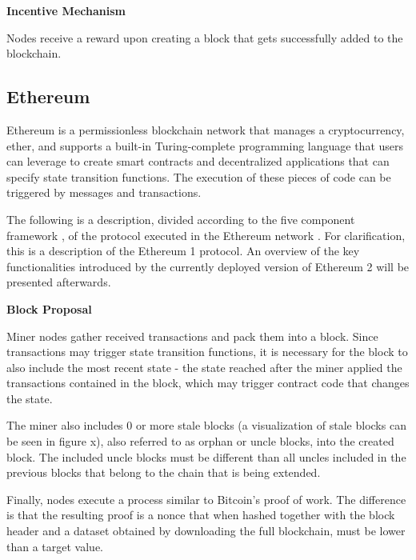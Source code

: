 \vspace{0.25cm}

\textbf{Incentive Mechanism}

Nodes receive a reward upon creating a block that gets successfully added to the blockchain.





\subsection{Ethereum}

Ethereum \cite{ethereum_whitepaper} \cite{ethereum_yellowpaper} is a permissionless blockchain network that manages a cryptocurrency, ether, and supports a built-in Turing-complete programming language that users can leverage to create smart contracts and decentralized applications that can specify state transition functions. The execution of these pieces of code can be triggered by messages and transactions.

The following is a description, divided according to the five component framework \cite{survey_bchain_networks}, of the protocol executed in the Ethereum network \cite{ethereum_whitepaper} \cite{ethereum_yellowpaper}. For clarification, this is a description of the Ethereum 1 protocol. An overview of the key functionalities introduced by the currently deployed version of Ethereum 2 \cite{eth2} will be presented afterwards.


\vspace{0.5cm}

\textbf{Block Proposal}

Miner nodes gather received transactions and pack them into a block. Since transactions may trigger state transition functions, it is necessary for the block to also include the most recent state - the state reached after the miner applied the transactions contained in the block, which may trigger contract code that changes the state.

The miner also includes 0 or more stale blocks (a visualization of stale blocks can be seen in figure x), also referred to as orphan or uncle blocks, into the created block. The included uncle blocks must be different than all uncles included in the previous blocks that belong to the chain that is being extended.

Finally, nodes execute a process similar to Bitcoin’s proof of work. The difference is that the resulting proof is a nonce that when hashed together with the block header and a dataset obtained by downloading the full blockchain, must be lower than a target value.

